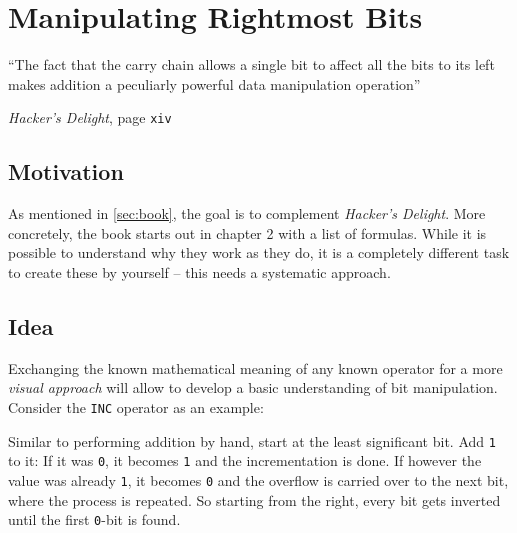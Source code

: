 \section{Manipulating Rightmost Bits}\label{sec:rightmost}
\epigraph{
``The fact that the carry chain allows a single bit
to affect all the bits to its left
makes addition a peculiarly powerful data manipulation operation''
}{
\emph{Hacker's Delight}, page \texttt{xiv}
\cite{Warren:2012:HD:2462741}
}


\subsection*{Motivation}
As mentioned in \autoref{sec:book},
the goal is to complement \emph{Hacker's Delight}.
More concretely, the book starts out in chapter 2 with a list of formulas.
While it is possible to understand why they work as they do,
it is a completely different task to create these by yourself
-- this needs a systematic approach.


\subsection*{Idea}
Exchanging the known mathematical meaning of any known operator
for a more \emph{visual approach} will allow to develop
a basic understanding of bit manipulation.
Consider the \lstinline$INC$ operator as an example:

Similar to performing addition by hand,
start at the least significant bit.
Add \lstinline$1$ to it:
If it was \lstinline$0$, it becomes \lstinline$1$
and the incrementation is done.
If however the value was already \lstinline$1$, it becomes \lstinline$0$
and the overflow is carried over to the next bit,
where the process is repeated.
So starting from the right, every bit gets inverted
until the first \lstinline$0$-bit is found.

